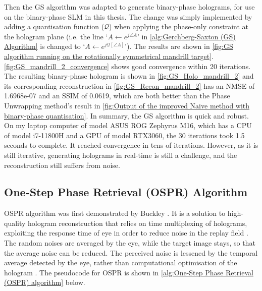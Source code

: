Then the GS algorithm was adapted to generate binary-phase holograms, for use on the binary-phase SLM in this thesis. The change was simply implemented by adding a quantisation function ($\mathcal{Q}$) when applying the phase-only constraint at the hologram plane (i.e. the line `$A \gets e^{j\angle A}$' in \cref{alg:Gerchberg-Saxton (GS) Algorithm} is changed to `$A \gets e^{j\mathcal{Q}[\angle A]}$'). The results are shown in \cref{fig:GS algorithm running on the rotationally symmetrical mandrill target}. \cref{fig:GS_mandrill_2_convergence} shows good convergence within 20 iterations. The resulting binary-phase hologram is shown in \cref{fig:GS_Holo_mandrill_2} and its corresponding reconstruction in \cref{fig:GS_Recon_mandrill_2} has an NMSE of 1.6968e-07 and an SSIM of 0.0619, which are both better than the Phase Unwrapping method's result in \cref{fig:Output of the improved Naive method with binary-phase quantisation}. In summary, the GS algorithm is quick and robust. On my laptop computer of model ASUS ROG Zephyrus M16, which has a CPU of model i7-11800H and a GPU of model RTX3060, the 30 iterations took 1.5 seconds to complete. It reached convergence in tens of iterations. However, as it is still iterative, generating holograms in real-time is still a challenge, and the reconstruction still suffers from noise.


\subsection{One-Step Phase Retrieval (OSPR) Algorithm}\label{sec:One Step Phase Retrieval (OSPR) Algorithm}
OSPR algorithm was first demonstrated by Buckley \cite{Buckley2006}. It is a solution to high-quality hologram reconstruction that relies on time multiplexing of holograms, exploiting the response time of eye in order to reduce noise in the replay field \cite{Cable2006}. The random noises are averaged by the eye, while the target image stays, so that the average noise can be reduced. The perceived noise is lessened by the temporal average detected by the eye, rather than computational optimisation of the hologram \cite{Cable2006}. The pseudocode for OSPR is shown in \cref{alg:One-Step Phase Retrieval (OSPR) algorithm} below.

